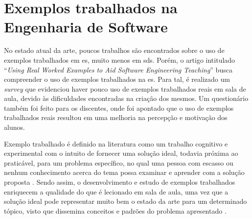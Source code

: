 \section{Exemplos trabalhados na Engenharia de Software}

No estado atual da arte, poucos trabalhos são encontrados sobre o uso de exemplos trabalhados em \gls{es}, muito menos em \gls{sds}. Porém, o artigo intitulado ``\textit{Using Real Worked Examples to Aid Software Engineering Teaching}'' \cite{Simone.Tonhao-etal:2021} busca compreender o uso de exemplos trabalhados na \gls{es}. Para tal, é realizado um \textit{survey} que evidenciou haver pouco uso de exemplos trabalhados reais em sala de aula, devido às dificuldades encontradas na criação dos mesmos. Um questionário também foi feito para os discentes, onde foi apontado que o uso de exemplos trabalhados reais resultou em uma melhoria na percepção e motivação dos alunos.


Exemplo trabalhado é definido na literatura como um trabalho cognitivo e experimental com o intuito de fornecer uma solução ideal, todavia próxima ao praticável, para um problema específico, no qual uma pessoa com escasso ou nenhum conhecimento acerca do tema possa examinar e aprender com a solução proposta \cite{Robert.Atkinson-etal:2000}. Sendo assim, o desenvolvimento e estudo de exemplos trabalhados enriquecem a qualidade do que é lecionado em sala de aula, uma vez que a solução ideal pode representar muito bem o estado da arte para um determinado tópico, visto que dissemina conceitos e padrões do problema apresentado \cite{Robert.Atkinson-etal:2000}.

